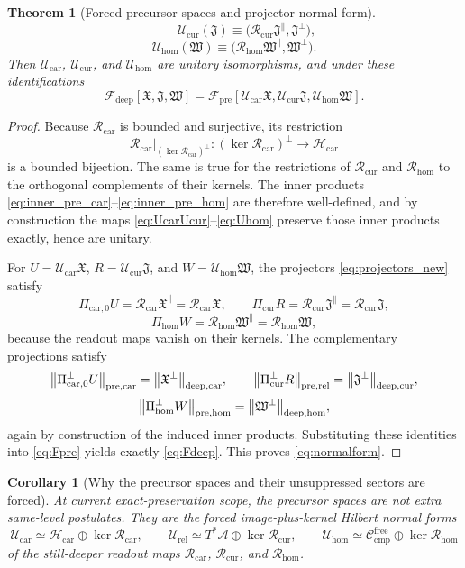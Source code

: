 \documentclass[11pt]{article}
\newcommand{\Sub}{\mathcal A}
\newcommand{\CompFree}{\mathscr C_{\mathrm{cmp}}^{\mathrm{free}}}
\newcommand{\PreFunctional}{\mathscr F_{\mathrm{pre}}}
\newcommand{\DeepFunctional}{\mathscr F_{\mathrm{deep}}}
\newcommand{\CarrierClass}{\mathscr H_{\mathrm{car}}}
\newcommand{\PreTensorClass}{\mathscr U_{\mathrm{car}}}
\newcommand{\PreRelabelClass}{\mathscr U_{\mathrm{rel}}}
\newcommand{\PreFreeClass}{\mathscr U_{\mathrm{hom}}}
\newcommand{\PreTensor}{U}
\newcommand{\PreRelabel}{R}
\newcommand{\PreFree}{W}
\newcommand{\PreCarProj}{\Pi_{\mathrm{car},0}}
\newcommand{\PreCarPerp}{\Pi_{\mathrm{car},0}^{\perp}}
\newcommand{\CurrentProj}{\Pi_{\mathrm{cur}}}
\newcommand{\CurrentPerp}{\Pi_{\mathrm{cur}}^{\perp}}
\newcommand{\FreeReadProj}{\Pi_{\mathrm{hom}}}
\newcommand{\FreeReadPerp}{\Pi_{\mathrm{hom}}^{\perp}}
\newcommand{\DeepTensor}{\mathfrak X}
\newcommand{\DeepRelabel}{\mathfrak J}
\newcommand{\DeepFree}{\mathfrak W}
\newcommand{\CarRead}{\mathcal R_{\mathrm{car}}}
\newcommand{\CurRead}{\mathcal R_{\mathrm{cur}}}
\newcommand{\HomRead}{\mathcal R_{\mathrm{hom}}}
\newcommand{\CarIso}{\mathcal U_{\mathrm{car}}}
\newcommand{\CurIso}{\mathcal U_{\mathrm{cur}}}
\newcommand{\HomIso}{\mathcal U_{\mathrm{hom}}}
\newtheorem{corollary}{Corollary}
\newtheorem{theorem}{Theorem}
\begin{document}
\begin{theorem}[Forced precursor spaces and projector normal form]
\begin{equation}
\qquad
\CurIso(\DeepRelabel)
\equiv
\bigl(\CurRead\DeepRelabel^{\parallel},\DeepRelabel^{\perp}\bigr),
\label{eq:UcarUcur}
\end{equation}
\begin{equation}
\HomIso(\DeepFree)
\equiv
\bigl(\HomRead\DeepFree^{\parallel},\DeepFree^{\perp}\bigr).
\label{eq:Uhom}
\end{equation}
Then \(\CarIso\), \(\CurIso\), and \(\HomIso\) are unitary isomorphisms, and under these identifications
\begin{equation}
\DeepFunctional[\DeepTensor,\DeepRelabel,\DeepFree]
=
\PreFunctional[\CarIso\DeepTensor,\CurIso\DeepRelabel,\HomIso\DeepFree].
\label{eq:normalform}
\end{equation}
\end{theorem}

\begin{proof}
Because \(\CarRead\) is bounded and surjective, its restriction
\[
\CarRead|_{(\ker\CarRead)^\perp}:(\ker\CarRead)^\perp\to\CarrierClass
\]
is a bounded bijection. The same is true for the restrictions of \(\CurRead\) and \(\HomRead\) to the orthogonal complements of their kernels. The inner products \eqref{eq:inner_pre_car}--\eqref{eq:inner_pre_hom} are therefore well-defined, and by construction the maps \eqref{eq:UcarUcur}--\eqref{eq:Uhom} preserve those inner products exactly, hence are unitary.

For \(\PreTensor=\CarIso\DeepTensor\), \(\PreRelabel=\CurIso\DeepRelabel\), and \(\PreFree=\HomIso\DeepFree\), the projectors \eqref{eq:projectors_new} satisfy
\[
\PreCarProj\PreTensor=\CarRead\DeepTensor^{\parallel}=\CarRead\DeepTensor,
\qquad
\CurrentProj\PreRelabel=\CurRead\DeepRelabel^{\parallel}=\CurRead\DeepRelabel,
\]
\[
\FreeReadProj\PreFree=\HomRead\DeepFree^{\parallel}=\HomRead\DeepFree,
\]
because the readout maps vanish on their kernels. The complementary projections satisfy
\[
\norm{\PreCarPerp\PreTensor}_{\mathrm{pre,car}}
=
\norm{\DeepTensor^{\perp}}_{\mathrm{deep,car}},
\qquad
\norm{\CurrentPerp\PreRelabel}_{\mathrm{pre,rel}}
=
\norm{\DeepRelabel^{\perp}}_{\mathrm{deep,cur}},
\]
\[
\norm{\FreeReadPerp\PreFree}_{\mathrm{pre,hom}}
=
\norm{\DeepFree^{\perp}}_{\mathrm{deep,hom}},
\]
again by construction of the induced inner products. Substituting these identities into \eqref{eq:Fpre} yields exactly \eqref{eq:Fdeep}. This proves \eqref{eq:normalform}.
\end{proof}

\begin{corollary}[Why the precursor spaces and their unsuppressed sectors are forced]
\label{cor:forced_precursor}
At current exact-preservation scope, the precursor spaces are not extra same-level postulates. They are the forced image-plus-kernel Hilbert normal forms
\[
\PreTensorClass\simeq \CarrierClass\oplus \ker\CarRead,
\qquad
\PreRelabelClass\simeq T^*\Sub\oplus \ker\CurRead,
\qquad
\PreFreeClass\simeq \CompFree\oplus \ker\HomRead
\]
of the still-deeper readout maps \(\CarRead\), \(\CurRead\), and \(\HomRead\).
\end{corollary}
\end{document}

